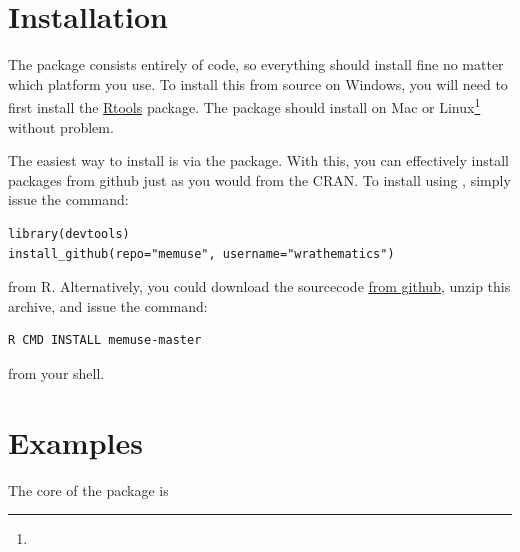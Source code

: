 \section{Installation}

The package consists entirely of  code, so everything should install fine no matter which platform you use.  To install this from source on Windows, you will need to first install the \href{http://cran.r-project.org/bin/windows/Rtools/Rtools216.exe}{Rtools} package.  The package should install on Mac or Linux\footnote{\interject} without problem.

The easiest way to install  is via the \href{http://cran.r-project.org/web/packages/devtools/index.html}{} package.  With this, you can effectively install packages from github just as you would from the CRAN.  To install  using , simply issue the command:
\begin{lstlisting}[language=rr]
library(devtools)
install_github(repo="memuse", username="wrathematics")
\end{lstlisting}
from R.  Alternatively, you could download the sourcecode \href{https://github.com/wrathematics/memuse/archive/master.zip}{from github}, unzip this archive, and issue the command:
\begin{lstlisting}[language=sh]
R CMD INSTALL memuse-master
\end{lstlisting}
from your shell.




\section{Examples}

The core of the  package is 